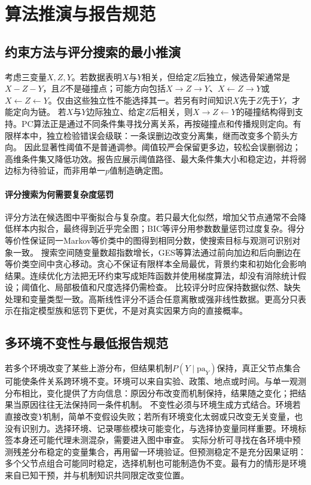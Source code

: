 \section{算法推演与报告规范}

\subsection{约束方法与评分搜索的最小推演}

考虑三变量$X,Z,Y$。若数据表明$X$与$Y$相关，但给定$Z$后独立，候选骨架通常是$X-Z-Y$，且$Z$不是碰撞点；可能方向包括$X\rightarrow Z\rightarrow Y$、$X\leftarrow Z\rightarrow Y$或$X\leftarrow Z\leftarrow Y$。仅由这些独立性不能选择其一。若另有时间知识$X$先于$Z$先于$Y$，才能定向为链。
若$X$与$Y$边际独立、给定$Z$后相关，则$X\rightarrow Z\leftarrow Y$的碰撞结构得到支持。PC算法正是通过不同条件集寻找分离关系，再按碰撞点和传播规则定向。有限样本中，独立检验错误会级联：一条误删边改变分离集，继而改变多个箭头方向。
因此显著性阈值不是普通调参。阈值较严会保留更多边，较松会误删弱边；高维条件集又降低功效。报告应展示阈值路径、最大条件集大小和稳定边，并将弱边标为待验证，而非用单一$p$值制造确定图。

\paragraph{评分搜索为何需要复杂度惩罚}

评分方法在候选图中平衡拟合与复杂度。若只最大化似然，增加父节点通常不会降低样本内拟合，最终得到近乎完全图；BIC等评分用参数数量惩罚过度复杂。得分等价性保证同一Markov等价类中的图得到相同分数，使搜索目标与观测可识别对象一致。
搜索空间随变量数超指数增长，GES等算法通过前向加边和后向删边在等价类空间中贪心移动。贪心不保证有限样本全局最优，背景约束和初始化会影响结果。连续优化方法把无环约束写成矩阵函数并使用梯度算法，却没有消除统计假设；阈值化、局部极值和尺度选择仍需检查。
比较评分时应保持数据似然、缺失处理和变量类型一致。高斯线性评分不适合任意离散或强非线性数据。更高分只表示在指定模型族和惩罚下更优，不是对真实因果方向的直接概率。

\subsection{多环境不变性与最低报告规范}

若多个环境改变了某些上游分布，但结果机制$P(Y\mid\mathrm{pa}_Y)$保持，真正父节点集合可能使条件关系跨环境不变。环境可以来自实验、政策、地点或时间。与单一观测分布相比，变化提供了方向信息：原因分布改变而机制保持，结果随之变化；把结果当原因往往无法保持同一条件机制。
不变性必须与环境生成方式结合。环境若直接改变$Y$机制，简单不变假设失败；若所有环境变化太弱或只改变无关变量，也没有识别力。选择环境、记录哪些模块可能变化，与选择协变量同样重要。环境标签本身还可能代理未测混杂，需要进入图中审查。
实际分析可寻找在各环境中预测残差分布稳定的变量集合，再用留一环境验证。但预测稳定不是充分因果证明：多个父节点组合可能同时稳定，选择机制也可能制造伪不变。最有力的情形是环境来自已知干预，并与机制知识共同限定改变位置。

